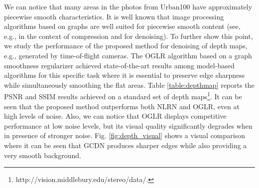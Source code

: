 \documentclass[journal]{IEEEtran}
\begin{document}
We can notice that many areas in the photos from Urban100 have approximately piecewise smooth characteristics. It is well known that image processing algorithms based on graphs are well suited for piecewise smooth content (see, e.g., \cite{Hu2015multiresolution,Fracastoro2017graph} in the context of compression and \cite{pang2017graph} for denoising). To further show this point, we study the performance of the proposed method for denoising of depth maps, e.g., generated by time-of-flight cameras. The OGLR algorithm \cite{pang2017graph} based on a graph smoothness regularizer achieved state-of-the-art results among model-based algorithms for this specific task where it is essential to preserve edge sharpness while simultaneously smoothing the flat areas. Table \ref{table:depthmap} reports the PSNR and SSIM results achieved on a standard set of depth maps\footnote{http://vision.middlebury.edu/stereo/data/.}. It can be seen that the proposed method outperforms both NLRN and OGLR, even at high levels of noise. Also, we can notice that OGLR displays competitive performance at low noise levels, but its visual quality significantly degrades when in presence of stronger noise. Fig. \ref{fig:depth_visual} shows a visual comparison where it can be seen that GCDN produces sharper edges while also providing a very smooth background.
\end{document}
